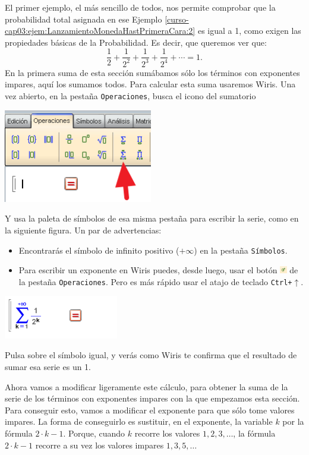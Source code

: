 \documentclass[10pt,a4paper]{article}\usepackage[]{graphicx}\usepackage[]{color}
\newcounter {cont01}
\begin{document}
El primer ejemplo, el más sencillo de todos, nos permite comprobar que la probabilidad total asignada en ese Ejemplo \ref{curso-cap03:ejem:LanzamientoMonedaHastPrimeraCara:2} es igual a 1, como exigen las propiedades básicas de la Probabilidad. Es decir, que queremos ver que:
     \[ \dfrac{1}{2}+\dfrac{1}{2^2}+\dfrac{1}{2^3}+\dfrac{1}{2^4}+\cdots=1. \]
En la primera suma de esta sección sumábamos sólo los términos con exponentes impares, aquí los sumamos todos. Para calcular esta suma usaremos Wiris. Una vez abierto, en la pestaña {\tt Operaciones}, busca el icono del sumatorio
\begin{center}
\includegraphics[width=6.5cm]{./fig/Tut05-02.png}
\end{center}
Y usa la paleta de símbolos de esa misma pestaña para escribir la serie, como en la siguiente figura. Un par de advertencias:
     \begin{itemize}
\item Encontrarás el símbolo de infinito positivo ($+\infty$) en la pestaña {\tt Símbolos}.
\item Para escribir un exponente en Wiris puedes, desde luego, usar el botón \includegraphics[width=0.3cm]{./fig/Tut05-03.png} de la pestaña {\tt Operaciones}. Pero es más rápido usar el atajo de teclado {\tt Ctrl+$\uparrow$}.
\end{itemize}
\begin{center}
\includegraphics[width=5cm]{./fig/Tut05-04.png}
\end{center}
Pulsa sobre el símbolo igual, y verás como Wiris te confirma que el resultado de sumar esa serie es un 1.

Ahora vamos a modificar ligeramente este cálculo, para obtener la suma de la serie de los términos con exponentes impares con la que empezamos esta sección. Para conseguir esto, vamos a modificar el exponente para que sólo tome valores impares. La forma de conseguirlo es sustituir, en el exponente, la variable $k$ por la fórmula $2\cdot k-1$. Porque, cuando $k$ recorre los valores $1,2,3,\ldots$, la fórmula $2\cdot k-1$ recorre a su vez los valores impares $1,3,5,\ldots$
     
\end{document}
